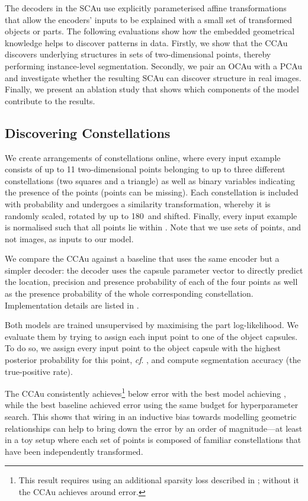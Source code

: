 \documentclass{article}
\begin{document}
The decoders in the \gls{SCAu} use explicitly parameterised affine transformations
that allow the encoders’ inputs to be explained with a small set of transformed objects or parts. 
The following evaluations show how the embedded geometrical knowledge helps to discover patterns in data.
Firstly, we show that the \gls{CCAu} discovers underlying structures in sets of two-dimensional points, thereby performing instance-level segmentation.
Secondly, we pair an \gls{OCAu} with a \gls{PCAu} and investigate whether the resulting \gls{SCAu} can discover structure in real images.
Finally, we present an ablation study that shows which components of the model contribute to the results.

\subsection{Discovering Constellations}
\label{sec:constellation_expr}


We create arrangements of constellations online, where every input example consists of up to 11 two-dimensional points belonging to up to three different constellations (two squares and a triangle) as well as binary variables indicating the presence of the points (points can be missing).
Each constellation is included with probability  and undergoes a similarity transformation, whereby it is randomly scaled, rotated by up to 180\textdegree\ and shifted.
Finally, every input example is normalised such that all points lie within .
Note that we use sets of points, and not images, as inputs to our model.

We compare the \gls{CCAu} against a baseline that uses the same encoder but a simpler decoder: the decoder uses the capsule parameter vector  to directly predict the location, precision and presence probability of each of the four points as well as the presence probability of the whole corresponding constellation. 
Implementation details are listed in 
.

Both models are trained unsupervised by maximising the part log-likelihood.
We evaluate them by trying to assign each input point to one of the object capsules.
To do so, we assign every input point to the object capsule with the highest posterior probability for this point, \textit{cf}. , and compute segmentation accuracy (\!\ie the true-positive rate).

The \gls{CCAu} consistently achieves\footnote{This result requires using an additional sparsity loss described in ; without it the \gls{CCAu} achieves around  error.} below  error with the best model achieving 
, while the best baseline achieved  error using the same budget for hyperparameter search.
This shows that wiring in an inductive bias towards modelling geometric relationships can help to bring down the error by an order of magnitude—at least in a toy setup where each set of points is composed of familiar constellations that have been independently transformed.
\end{document}
